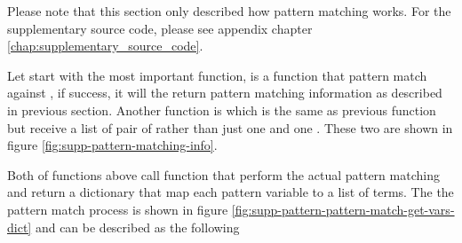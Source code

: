 \documentclass[master.tex]{subfiles}
\begin{document}
Please note that this section only described how pattern matching works. For the
supplementary source code, please see appendix chapter
\ref{chap:supplementary_source_code}.

Let start with the most important function,  is a function
that pattern match  against , if success, it will
the return pattern matching information as described in previous section.
Another function is  which is the same as
previous function but receive a list of pair of  rather
than just one  and one . These two are shown in
figure \ref{fig:supp-pattern-matching-info}.

Both of functions above call function  that
perform the actual pattern matching and return a dictionary that map each
pattern variable to a list of terms. The the pattern match process is shown in
figure \ref{fig:supp-pattern-pattern-match-get-vars-dict} and can be
described as the following

\newpage
\end{document}
